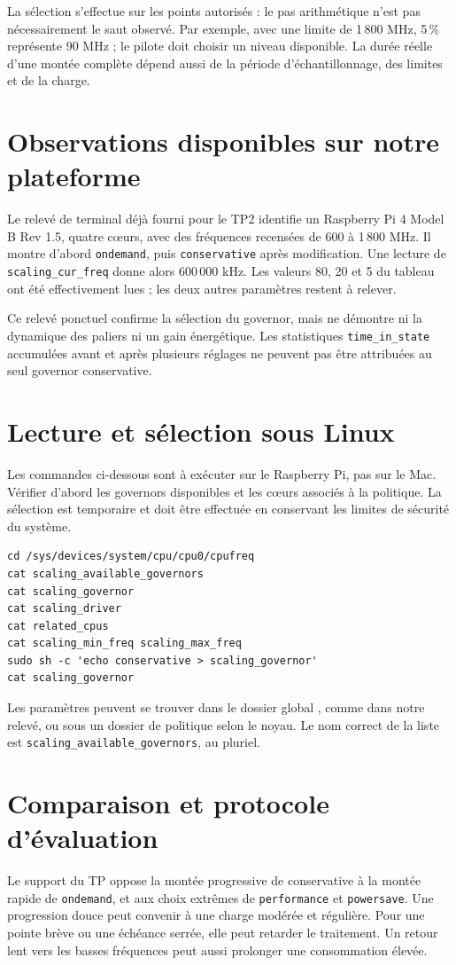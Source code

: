 \documentclass[11pt,a4paper]{article}
\begin{document}
La sélection s'effectue sur les points autorisés : le pas arithmétique n'est pas nécessairement le saut observé. Par exemple, avec une limite de 1\,800 MHz, 5\,\% représente 90 MHz ; le pilote doit choisir un niveau disponible. La durée réelle d'une montée complète dépend aussi de la période d'échantillonnage, des limites et de la charge.

\section{Observations disponibles sur notre plateforme}
Le relevé de terminal déjà fourni pour le TP2 identifie un Raspberry Pi 4 Model B Rev 1.5, quatre c\oe{}urs, avec des fréquences recensées de 600 à 1\,800 MHz. Il montre d'abord \texttt{ondemand}, puis \texttt{conservative} après modification. Une lecture de \texttt{scaling\_cur\_freq} donne alors 600\,000 kHz. Les valeurs 80, 20 et 5 du tableau ont été effectivement lues ; les deux autres paramètres restent à relever.

Ce relevé ponctuel confirme la sélection du governor, mais ne démontre ni la dynamique des paliers ni un gain énergétique. Les statistiques \texttt{time\_in\_state} accumulées avant et après plusieurs réglages ne peuvent pas être attribuées au seul governor conservative.

\section{Lecture et sélection sous Linux}
Les commandes ci-dessous sont à exécuter sur le Raspberry Pi, pas sur le Mac. Vérifier d'abord les governors disponibles et les c\oe{}urs associés à la politique. La sélection est temporaire et doit être effectuée en conservant les limites de sécurité du système.
\begin{lstlisting}
cd /sys/devices/system/cpu/cpu0/cpufreq
cat scaling_available_governors
cat scaling_governor
cat scaling_driver
cat related_cpus
cat scaling_min_freq scaling_max_freq
sudo sh -c 'echo conservative > scaling_governor'
cat scaling_governor
\end{lstlisting}
Les paramètres peuvent se trouver dans le dossier global , comme dans notre relevé, ou sous un dossier de politique selon le noyau. Le nom correct de la liste est \texttt{scaling\_available\_governors}, au pluriel.

\section{Comparaison et protocole d'évaluation}
Le support du TP oppose la montée progressive de conservative à la montée rapide de \texttt{ondemand}, et aux choix extrêmes de \texttt{performance} et \texttt{powersave}. Une progression douce peut convenir à une charge modérée et régulière. Pour une pointe brève ou une échéance serrée, elle peut retarder le traitement. Un retour lent vers les basses fréquences peut aussi prolonger une consommation élevée.
\end{document}

